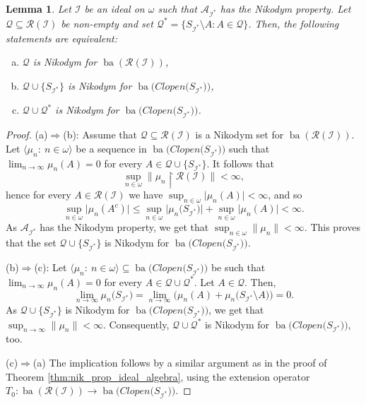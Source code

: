 \documentclass[a4paper,11pt,fleqn]{amsart}
\newtheorem{lemma}[theorem]{Lemma}
\theoremstyle{definition}
\theoremstyle{remark}
\numberwithin{equation}{section}
\newcommand{\N}{\mathbb{N}}
\newcommand{\aA}{\mathcal{A}}
\newcommand{\iI}{\mathcal{I}}
\newcommand{\qQ}{\mathcal{Q}}
\newcommand{\rR}{\mathcal{R}}
\DeclareMathOperator{\ba}{ba}
\newcommand{\rstr}{\restriction}
\newcommand{\sm}{\setminus}
\newcommand{\sub}{\subseteq}
\newcommand{\seqn}[1]{\big\langle#1\colon\ n\io\big\rangle}
\newcommand{\io}{\in\omega}%
\begin{document}
\begin{lemma}\label{lemma:nikodym_set}
    Let $\iI$ be an ideal on $\omega$ such that $\aA_{\iI^*}$ has the Nikodym property. Let $\qQ\sub\rR(\iI)$ be non-empty and set $\qQ^*=\big\{S_{\iI^*}\sm A\colon A\in\qQ\big\}$. Then, the following statements are equivalent:
    \begin{enumerate}[(a)]
    \item $\qQ$ is Nikodym for $\ba(\rR(\iI))$,
    \item $\qQ\cup\big\{S_{\iI^*}\!\big\}$ is Nikodym for $\ba\!\big(Clopen\big(S_{\iI^*}\big)\big)$,
    \item $\qQ\cup\qQ^*$ is Nikodym for $\ba\!\big(Clopen\big(S_{\iI^*}\big)\big)$.
    \end{enumerate}
\end{lemma}
\begin{proof}
    (a)$\Rightarrow$(b): Assume that $\qQ\sub\rR(\iI)$ is a Nikodym set for $\ba(\rR(\iI))$. Let $\seqn{\mu_n}$ be a sequence in $\ba\!\big(Clopen\big(S_{\iI^*}\big)\big)$ such that $\lim_{n\to\infty}\mu_n(A)=0$ for every $A\in\qQ\cup\big\{S_{\iI^*}\!\big\}$. It follows that
    \[\sup_{n\io}\big\|\mu_n\rstr\rR(\iI)\big\|<\infty,\]
    hence for every $A\in\rR(\iI)$ we have $\sup_{n\io}\big|\mu_n(A)\big|<\infty$, and so
    \[\sup_{n\io}\big|\mu_n(A^c)\big|\le\sup_{n\io}\big|\mu_n\big(S_{\iI^*}\big)\big|+\sup_{n\io}\big|\mu_n(A)\big|<\infty.\]
    As $\aA_{\iI^*}$ has the Nikodym property, we get that $\sup_{n\io}\big\|\mu_n\big\|<\infty$. This proves that the set $\qQ\cup\big\{S_{\iI^*}\!\big\}$ is Nikodym for $\ba\!\big(Clopen\big(S_{\iI^*}\big)\big)$. %

    (b)$\Rightarrow$(c): Let $\seqn{\mu_n}\sub\ba\!\big(Clopen\big(S_{\iI^*}\big)\big)$ be such that $\lim_{n\to\infty}\mu_n(A)=0$ for every $A\in\qQ\cup\qQ^*$. Let $A\in\qQ$. Then,
    \[\lim_{n\to\infty}\mu_n\big(S_{\iI^*}\big)=\lim_{n\to\infty}\big(\mu_n(A)+\mu_n\big(S_{\iI^*}\sm A\big)\big)=0.\]
    As $\qQ\cup\big\{S_{\iI^*}\big\}$ is Nikodym for $\ba\!\big(Clopen\big(S_{\iI^*}\big)\big)$, we get that $\sup_{n\to\infty}\big\|\mu_n\big\|<\infty$. Consequently, $\qQ\cup\qQ^*$ is Nikodym for $\ba\!\big(Clopen\big(S_{\iI^*}\big)\big)$, too.

    (c)$\Rightarrow$(a) The implication follows by a similar argument as in the proof of Theorem \ref{thm:nik_prop_ideal_algebra}, using the extension operator $T_0\colon\ba(\rR(\iI))\to\ba\!\big(Clopen\big(S_{\iI^*}\big)\big)$.
\end{proof}
\end{document}
